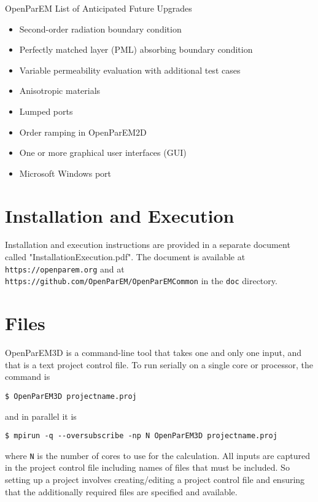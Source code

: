 \documentclass[titlepage]{article}
\renewcommand\_{\textunderscore\linebreak[1]}
\begin{document}
\begin{table}[ht]
\caption{OpenParEM List of Anticipated Future Upgrades}
\noindent \hrulefill
\begin{itemize}[nosep]
   \item Second-order radiation boundary condition
   \item Perfectly matched layer (PML) absorbing boundary condition
   \item Variable permeability evaluation with additional test cases
   \item Anisotropic materials
   \item Lumped ports
   \item Order ramping in OpenParEM2D
   \item One or more graphical user interfaces (GUI)
   \item Microsoft Windows\textsuperscript{\textregistered} port
\end{itemize}
\noindent \hrulefill
\label{table:upgrades}
\end{table}

\section{Installation and Execution}

Installation and execution instructions are provided in a separate document called \newline"Installation\_Execution.pdf".  The document is available at \texttt{https://openparem.org} and at \newline\texttt{https://github.com/OpenParEM/OpenParEMCommon} in the \texttt{doc} directory. 

\section{Files}
\label{sec:files}

OpenParEM3D is a command-line tool that takes one and only one input, and that is a text project control file.  To run serially on a single core or processor, the command is
\begin{Verbatim}[fontsize=\small]
   $ OpenParEM3D projectname.proj
\end{Verbatim}
and in parallel it is
\begin{Verbatim}[fontsize=\small]
   $ mpirun -q --oversubscribe -np N OpenParEM3D projectname.proj
\end{Verbatim}
where \verb+N+ is the number of cores to use for the calculation.  All inputs are captured in the project control file including names of files that must be included. So setting up a project involves creating/editing a project control file and ensuring that the additionally required files are specified and available.
\end{document}
